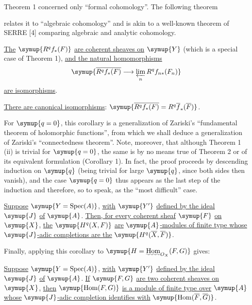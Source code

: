 Theorem 1 concerned only “formal cohomology”. The following theorem

relates it to “algebraic cohomology” and is akin to a well-known theorem of
SERRE [4] comparing algebraic and analytic cohomology.

 \uline{The} $\symup{R^{q}f_{*}(F)}$ \uline{are
coherent sheaves on} $\symup{Y}$ (which is a special case of Theorem 1), \uline{and the natural
homomorphisms}
\[
  \symup{\overline{R^{q}f_{*}(F)}
  \longrightarrow \varprojlim\limits_n R^{q}f_{n*}(F_n)}
\]
\uline{are isomorphisms}.

 \uline{There are canonical isomorphisms}:
$\symup{\overline{R^{q}f_{*}(F)}=R^{q}\overline f_{*}(\overline F)}$.

For $\symup{q=0}$, this corollary is a generalization of Zariski's “fundamental theorem
of holomorphic functions”, from which we shall deduce a generalization of
Zariski's “connectedness theorem”. Note, moreover, that although Theorem 1
(ii) is trivial for $\symup{q=0}$, the same is by no means true of Theorem 2
or of its equivalent formulation (Corollary 1). In fact, the proof proceeds by
descending induction on $\symup{q}$ (being trivial for large $\symup{q}$, since both sides then
vanish), and the case $\symup{q=0}$ thus appears as the last step of the induction and
therefore, so to speak, as the “most difficult” case.

 \uline{Suppose} $\symup{Y=\operatorname{Spec}(A)}$, \uline{with} $\symup{Y'}$ \uline{defined by
the ideal} $\symup{J}$ \uline{of} $\symup{A}$. \uline{Then, for every coherent sheaf} $\symup{F}$ \uline{on} $\symup{X}$, \uline{the}
$\symup{H^{q}(X,F)}$ \uline{are} $\symup{A}$\uline{-modules of finite type whose} $\symup{J}$\uline{-adic completions are the}
$\symup{H^{q}(\overline X,\overline F)}$.

Finally, applying this corollary to
$\symup{H=\mathop{\text{\uwave{Hom}}}\nolimits_{O_X}(F,G)}$ gives:

 \uline{Suppose} $\symup{Y=\operatorname{Spec}(A)}$, \uline{with} $\symup{Y'}$ \uline{defined by
the ideal} $\symup{J}$ \uline{of} $\symup{A}$. \uline{If} $\symup{F,G}$ \uline{are two coherent sheaves on} $\symup{X}$, \uline{then}
$\symup{\operatorname{Hom}(F,G)}$ \uline{is a module of finite type over} $\symup{A}$ \uline{whose} $\symup{J}$\uline{-adic
completion identifies with}
$\symup{\operatorname{Hom}(\overline F,\overline G)}$.

